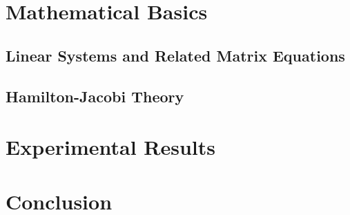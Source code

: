 \documentclass[
  bibliography=totoc,
  listof=totoc,
  oneside,
]{scrbook}
\begin{document}
\frontmatter



\cleardoublepage
{}
\tableofcontents
\listoffigures

\cleardoublepage
{}
\listoftheorems[ignore=remark]

\listoftodos
\todototoc

\mainmatter


\chapter{Mathematical Basics}
\section{Linear Systems and Related Matrix Equations}
\section{Hamilton-Jacobi Theory}






\chapter{Experimental Results}
\chapter{Conclusion}

\appendix







\backmatter
\glsaddallunused
\printglossaries
\printbibliography
\end{document}
